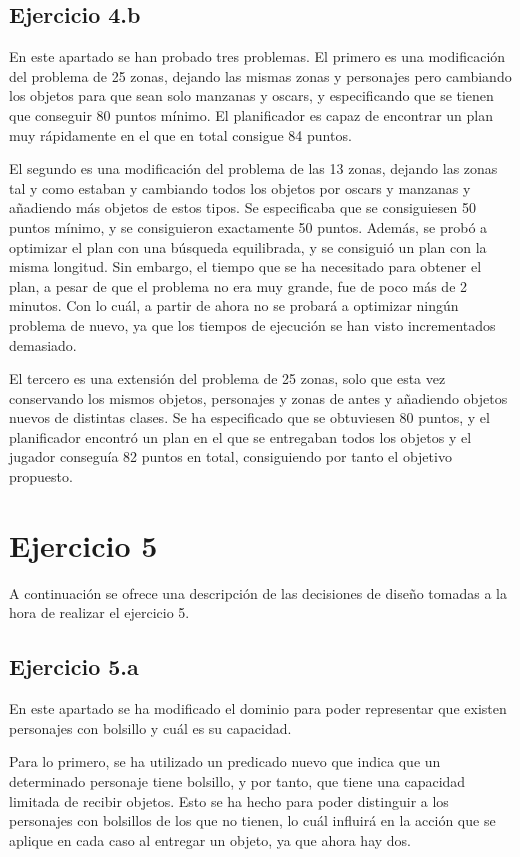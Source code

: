 \documentclass[11pt,a4paper]{article}
\begin{document}
\subsection{Ejercicio 4.b}

En este apartado se han probado tres problemas. El primero es una modificación del problema de 25 zonas, dejando las mismas zonas
y personajes pero cambiando los objetos para que sean solo manzanas y oscars, y especificando que se tienen que conseguir 80 puntos
mínimo. El planificador es capaz de encontrar un plan muy rápidamente en el que en total consigue 84 puntos.

El segundo es una modificación del problema de las 13 zonas, dejando las zonas tal y como estaban y cambiando todos los objetos por
oscars y manzanas y añadiendo más objetos de estos tipos. Se especificaba que se consiguiesen 50 puntos mínimo, y se consiguieron
exactamente 50 puntos. Además, se probó a optimizar el plan con una búsqueda equilibrada, y se consiguió un plan con la misma
longitud. Sin embargo, el tiempo que se ha necesitado para obtener el plan, a pesar de que el problema no era muy grande, fue de poco
más de 2 minutos. Con lo cuál, a partir de ahora no se probará a optimizar ningún problema de nuevo, ya que los tiempos de ejecución
se han visto incrementados demasiado.

El tercero es una extensión del problema de 25 zonas, solo que esta vez conservando los mismos objetos, personajes y zonas de antes
y añadiendo objetos nuevos de distintas clases. Se ha especificado que se obtuviesen 80 puntos, y el planificador encontró un plan
en el que se entregaban todos los objetos y el jugador conseguía 82 puntos en total, consiguiendo por tanto el objetivo propuesto.

\section{Ejercicio 5}

A continuación se ofrece una descripción de las decisiones de diseño tomadas a la hora de realizar el ejercicio 5.

\subsection{Ejercicio 5.a}

En este apartado se ha modificado el dominio para poder representar que existen personajes con bolsillo y cuál es su capacidad.

Para lo primero, se ha utilizado un predicado nuevo que indica que un determinado personaje tiene bolsillo, y por tanto, que tiene
una capacidad limitada de recibir objetos. Esto se ha hecho para poder distinguir a los personajes con bolsillos de los que
no tienen, lo cuál influirá en la acción que se aplique en cada caso al entregar un objeto, ya que ahora hay dos.
\end{document}
